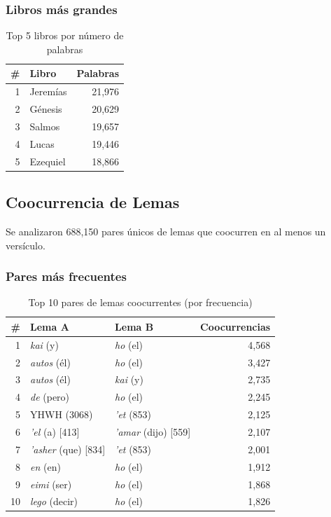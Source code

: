 \documentclass[12pt,a4paper]{article}
\begin{document}
\subsubsection{Libros m\'as grandes}

\begin{table}[H]
\centering
\caption{Top 5 libros por n\'umero de palabras}
\begin{tabular}{rlr}
\toprule
\textbf{\#} & \textbf{Libro} & \textbf{Palabras} \\
\midrule
1 & Jerem\'ias   & 21,976 \\
2 & G\'enesis    & 20,629 \\
3 & Salmos       & 19,657 \\
4 & Lucas        & 19,446 \\
5 & Ezequiel     & 18,866 \\
\bottomrule
\end{tabular}
\end{table}


\subsection{Coocurrencia de Lemas}

Se analizaron 688,150 pares \'unicos de lemas que coocurren en al menos un vers\'iculo.

\subsubsection{Pares m\'as frecuentes}

\begin{table}[H]
\centering
\caption{Top 10 pares de lemas coocurrentes (por frecuencia)}
\label{tab:cooccpairs}
\begin{tabular}{rllr}
\toprule
\textbf{\#} & \textbf{Lema A} & \textbf{Lema B} & \textbf{Coocurrencias} \\
\midrule
1  & \textit{kai} (y)        & \textit{ho} (el)     & 4,568 \\
2  & \textit{autos} (\'el)   & \textit{ho} (el)     & 3,427 \\
3  & \textit{autos} (\'el)   & \textit{kai} (y)     & 2,735 \\
4  & \textit{de} (pero)      & \textit{ho} (el)     & 2,245 \\
5  & YHWH (3068)              & \textit{'et} (853)   & 2,125 \\
6  & \textit{'el} (a) [413]  & \textit{'amar} (dijo) [559] & 2,107 \\
7  & \textit{'asher} (que) [834] & \textit{'et} (853) & 2,001 \\
8  & \textit{en} (en)        & \textit{ho} (el)     & 1,912 \\
9  & \textit{eimi} (ser)     & \textit{ho} (el)     & 1,868 \\
10 & \textit{lego} (decir)   & \textit{ho} (el)     & 1,826 \\
\bottomrule
\end{tabular}
\end{table}
\end{document}
